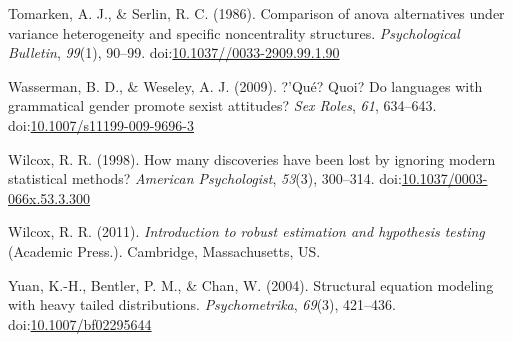 \documentclass[man,floatsintext]{apa6}
\begin{document}
\hypertarget{ref-Tomarken_and_Serlin_1986}{}
Tomarken, A. J., \& Serlin, R. C. (1986). Comparison of anova
alternatives under variance heterogeneity and specific noncentrality
structures. \emph{Psychological Bulletin}, \emph{99}(1), 90--99.
doi:\href{https://doi.org/10.1037//0033-2909.99.1.90}{10.1037//0033-2909.99.1.90}

\hypertarget{ref-Wasserman_and_Weseley_2009}{}
Wasserman, B. D., \& Weseley, A. J. (2009). ?'Qué? Quoi? Do languages
with grammatical gender promote sexist attitudes? \emph{Sex Roles},
\emph{61}, 634--643.
doi:\href{https://doi.org/10.1007/s11199-009-9696-3}{10.1007/s11199-009-9696-3}

\hypertarget{ref-Wilcox_1998}{}
Wilcox, R. R. (1998). How many discoveries have been lost by ignoring
modern statistical methods? \emph{American Psychologist}, \emph{53}(3),
300--314.
doi:\href{https://doi.org/10.1037/0003-066x.53.3.300}{10.1037/0003-066x.53.3.300}

\hypertarget{ref-Wilcox_2011}{}
Wilcox, R. R. (2011). \emph{Introduction to robust estimation and
hypothesis testing} (Academic Press.). Cambridge, Massachusetts, US.

\hypertarget{ref-Yuan_et_al_2004}{}
Yuan, K.-H., Bentler, P. M., \& Chan, W. (2004). Structural equation
modeling with heavy tailed distributions. \emph{Psychometrika},
\emph{69}(3), 421--436.
doi:\href{https://doi.org/10.1007/bf02295644}{10.1007/bf02295644}

\clearpage
\makeatletter
\efloat@restorefloats
\makeatother
\end{document}
